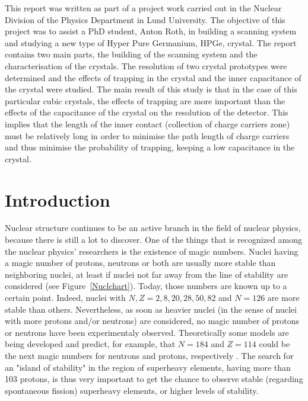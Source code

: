 \documentclass[11pt,a4paper]{article}
\begin{document}
This report was written as part of a project work carried out in the Nuclear Division of the Physics Department in Lund University. The objective of this project was to assist a PhD student, Anton Roth, in building a scanning system and studying a new type of Hyper Pure Germanium, HPGe, crystal. The report contains two main parts, the building of the scanning system and the characterisation of the crystals. The resolution of two crystal prototypes were determined and the effects of trapping in the crystal and the inner capacitance of the crystal were studied. The main result of this study is that in the case of this particular cubic crystals, the effects of trapping are more important than the effects of the capacitance of the crystal on the resolution of the detector. This implies that the length of the inner contact (collection of charge carriers zone) must be relatively long in order to minimise the path length of charge carriers and thus minimise the probability of trapping, keeping a low capacitance in the crystal.

\null\vfill

\newpage

\section{Introduction}

Nuclear structure continues to be an active branch in the field of nuclear physics, because there is still a lot to discover. One of the things that is recognized among the nuclear physics' researchers is the existence of magic numbers. Nuclei having a magic number of protons, neutrons or both are usually more stable than neighboring nuclei, at least if nuclei not far away from the line of stability are considered (see Figure~\ref{Nuclchart}). Today, those numbers are known up to a certain point. Indeed, nuclei with $N, Z = 2, 8, 20, 28, 50, 82$ and $N = 126$ are more stable than others. Nevertheless, as soon as heavier nuclei (in the sense of nuclei with more protons and/or neutrons) are considered, no magic number of protons or neutrons have been experimentaly observed. Theoretically some models are being developed and predict, for example, that $N = 184$ and $Z = 114$ could be the next magic numbers for neutrons and protons, respectively \cite{Sobi}. The search for an "island of stability" in the region of superheavy elements, having more than 103 protons, is thus very important to get the chance to observe stable (regarding spontaneous fission) superheavy elements, or higher levels of stability.
\end{document}
